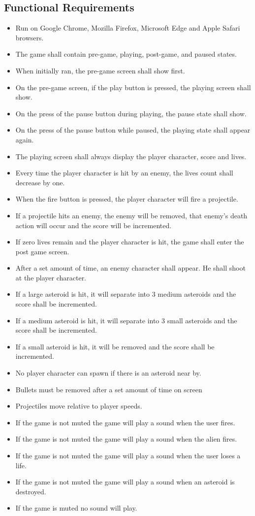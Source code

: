 \documentclass[12pt, titlepage]{article}
\begin{document}
\subsection{Functional Requirements}
  \begin{itemize}
    \item Run on Google Chrome, Mozilla Firefox, Microsoft Edge and Apple Safari browsers.
    \item The game shall contain pre-game, playing, post-game, and paused states.
    \item When initially ran, the pre-game screen shall show first.
    \item On the pre-game screen, if the play button is pressed, the playing screen shall show.
    \item On the press of the pause button during playing, the pause state shall show.
    \item On the press of the pause button while paused, the playing state shall appear again.
    \item The playing screen shall always display the player character, score and lives.
    \item Every time the player character is hit by an enemy, the lives count shall decrease by one.
    \item When the fire button is pressed, the player character will fire a projectile.
    \item If a projectile hits an enemy, the enemy will be removed, that enemy's death action will occur and the score will be incremented.
    \item If zero lives remain and the player character is hit, the game shall enter the post game screen.
    \item After a set amount of time, an enemy character shall appear. He shall shoot at the player character.
    \item If a large asteroid is hit, it will separate into 3 medium asteroids and the score shall be incremented.
    \item If a medium asteroid is hit, it will separate into 3 small asteroids and the score shall be incremented.
    \item If a small asteroid is hit, it will be removed and the score shall be incremented.
    \item No player character can spawn if there is an asteroid near by.
    \item Bullets must be removed after a set amount of time on screen
    \item Projectiles move relative to player speeds.
    \item If the game is not muted the game will play a sound when the user fires.
    \item If the game is not muted the game will play a sound when the alien fires.
    \item If the game is not muted the game will play a sound when the user loses a life.
    \item If the game is not muted the game will play a sound when an asteroid is destroyed.
    \item If the game is muted no sound will play.
  \end{itemize}
\end{document}
